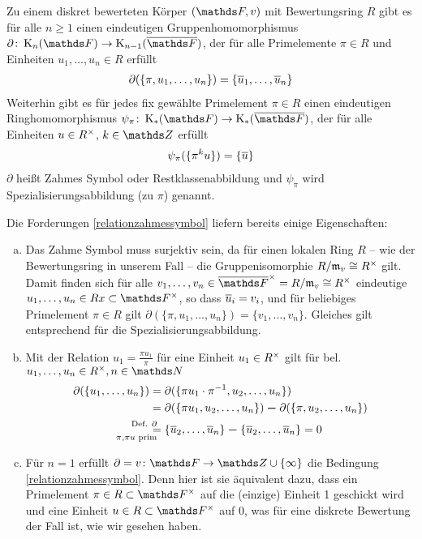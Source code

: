 \documentclass[ngerman,fontsize=11pt, paper=a4, parskip=half, titlepage=true, toc=bib]{scrartcl}
\begin{document}
\begin{Satz}\label{zahmessymbolhom}
  Zu einem diskret bewerteten Körper $(\F,v)$ mit Bewertungsring $R$
  gibt es für alle $n\geq 1$ einen eindeutigen Gruppenhomomorphismus 
  $\partial\colon \KnF\to \K_{n-1}(\bF)$,
  der für alle Primelemente $\pi\in R$ und 
  Einheiten $u_1,\dotsc, u_n\in R$ erfüllt
  \begin{gather}\label{relationzahmessymbol}
    \partial(\{\pi,u_1,\dotsc,u_n\})=\{\overline u_1, \dotsc, \overline u_n\}
  \end{gather}
  Weiterhin gibt es für jedes fix gewählte Primelement $\pi\in R$
  einen eindeutigen Ringhomomorphismus $\psi_\pi\colon\KF\to\KbF$, 
  der für alle Einheiten $u\in R^\times$, $k\in\Z$ erfüllt
  \begin{gather}\label{relationdualzahmessymbol}
    \psi_\pi(\{\pi^ku\})=\{\overline u\}
  \end{gather}
  $\partial$ heißt Zahmes Symbol oder Restklassenabbildung und $\psi_\pi$
  wird Spezialisierungsabbildung (zu $\pi$) genannt.
\end{Satz}


\begin{Bem}\label{bemzahmessymbolhom}
  Die Forderungen \ref{relationzahmessymbol} liefern
  bereits einige Eigenschaften:
  \begin{enumerate}[a)]
  \item Das Zahme Symbol muss surjektiv sein, da für einen lokalen Ring
    $R$ – wie der Bewertungsring in unserem Fall – die Gruppenisomorphie 
    $R/\mathfrak{m}_v\cong R^\times$ gilt. Damit finden sich für alle 
    $v_1,\dotsc,v_n\in \bF^\times= R/\frakm_v\cong \Rx$
    eindeutige $u_1,\dotsc, u_n\in\\Rx\subset\Fx$, 
    so dass $\overline u_i=v_i$, 
    und für beliebiges Primelement $\pi\in R$ gilt
    $\partial(\{\pi,u_1,\dotsc, u_n\})=\{v_1,\dotsc, v_n\}$.
    Gleiches gilt entsprechend für die Spezialisierungsabbildung.
  \item   Mit der Relation $u_1=\frac{\pi u_1}{\pi}$
    für eine Einheit $u_1\in R^\times$
    gilt für bel. $u_1,\dotsc, u_n\in \Rx, n\in\N$
    \begin{align*}
      \partial(\{u_1,\dotsc,u_n\})
      &= \partial(\{\pi u_1\cdot \pi^{-1},u_2,\dotsc,u_n\})\\
      &= \partial(\{\pi u_1,u_2,\dotsc,u_n\})\m 
        \partial(\{\pi,u_2,\dotsc,u_n\})\\
      &\overset{\mathllap{\text{Def. }\partial}}{
        \underset{\mathllap{\pi,\pi u\text{ prim}}}{=}}
        \{\ov u_2,\dotsc, \ov u_n\} \m \{\ov u_2,\dotsc, \ov u_n\}
        = 0
    \end{align*}
  \item Für $n=1$ erfüllt $\partial=v\colon \F\to \Z\cup\{\infty\}$ 
    die Bedingung \ref{relationzahmessymbol}.
    Denn hier ist sie äquivalent dazu, dass ein Primelement 
    $\pi\in R\subset \Fx$ auf die (einzige) Einheit 1 
    geschickt wird und eine Einheit $u\in R\subset \Fx$ auf 0,
    was für eine diskrete Bewertung der Fall ist, wie wir gesehen haben.
  \end{enumerate}
\end{Bem}
\end{document}

